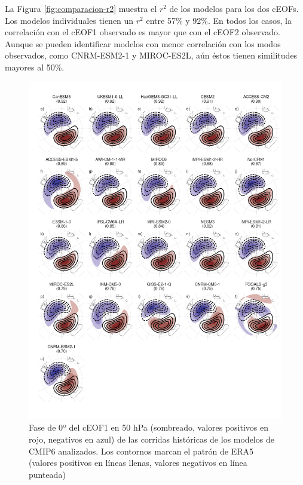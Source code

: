 \documentclass[12pt,oneside,a4paper]{reedthesis}
\begin{document}
La Figura \ref{fig:comparacion-r2} muestra el \(r^2\) de los modelos para los dos cEOFs.
Los modelos individuales tienen un \(r^2\) entre 57\% y 92\%.
En todos los casos, la correlación con el cEOF1 observado es mayor que con el cEOF2 observado.
Aunque se pueden identificar modelos con menor correlación con los modos observados, como CNRM-ESM2-1 y MIROC-ES2L, aún éstos tienen similitudes mayores al 50\%.

\begin{figure}

{\centering \includegraphics{figures/50-cmip6/todos-ceof1-1} 

}

\caption{Fase de 0º del cEOF1 en 50 hPa (sombreado, valores positivos en rojo, negativos en azul) de las corridas históricas de los modelos de CMIP6 analizados. Los contornos marcan el patrón de ERA5 (valores positivos en líneas llenas, valores negativos en línea punteada)}\label{fig:todos-ceof1}
\end{figure}
\end{document}
